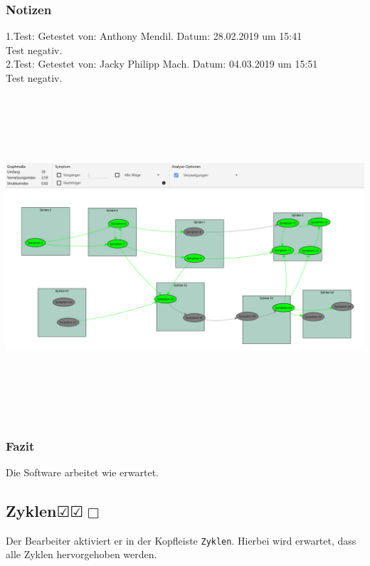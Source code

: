 \documentclass[enabledeprecatedfontcommands]{scrartcl}
\newcommand{\subsectiont}[2]{\subsection[#1]{#1{\normalsize\normalfont #2}}}
\newcommand{\leer}{$\Box$}
\newcommand{\ok}{$\CheckedBox$}
\begin{document}
\subsubsection{Notizen}
1.Test: Getestet von: Anthony Mendil. Datum: 28.02.2019 um 15:41 \\
Test negativ. \\
2.Test: Getestet von: Jacky Philipp Mach. Datum: 04.03.2019 um 15:51 \\
Test negativ.
\begin{center}
\includegraphics[height=12cm, angle=90]{analyseverzweigungen.PNG}
\end{center}
\subsubsection{Fazit}
Die Software arbeitet wie erwartet.

\subsectiont{Zyklen}{\dotfill\ok\ok\leer}
Der Bearbeiter aktiviert er in der Kopfleiste \texttt{Zyklen}. Hierbei wird erwartet, dass alle Zyklen hervorgehoben werden. 
\end{document}

